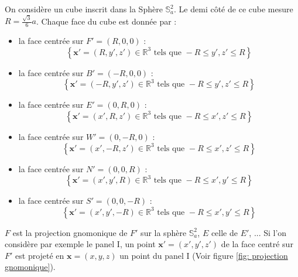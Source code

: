 On considère un cube inscrit dans la Sphère $\mathbb{S}_a^2$. Le demi côté de ce cube mesure $R=\frac{\sqrt{3}}{6}a$. Chaque face du cube est donnée par :
\begin{itemize}
\item la face centrée sur $F'=(R,0,0)$ : 
\begin{equation}
\left\lbrace
\mathbf{x}' = (R,y',z') \in \mathbb{R}^3 \text{ tels que } -R  \leq y',z' \leq R
\right\rbrace
\end{equation}

\item la face centrée sur $B'=(-R,0,0)$ : 
\begin{equation}
\left\lbrace
\mathbf{x}' = (-R,y',z') \in \mathbb{R}^3 \text{ tels que } -R  \leq y',z' \leq R
\right\rbrace
\end{equation}

\item la face centrée sur $E'=(0,R,0)$ : 
\begin{equation}
\left\lbrace
\mathbf{x}' = (x',R,z') \in \mathbb{R}^3 \text{ tels que } -R  \leq x',z' \leq R
\right\rbrace
\end{equation}

\item la face centrée sur $W'=(0,-R,0)$ : 
\begin{equation}
\left\lbrace
\mathbf{x}' = (x',-R,z') \in \mathbb{R}^3 \text{ tels que } -R  \leq x',z' \leq R
\right\rbrace
\end{equation}

\item la face centrée sur $N'=(0,0,R)$ : 
\begin{equation}
\left\lbrace
\mathbf{x}' = (x',y',R) \in \mathbb{R}^3 \text{ tels que } -R  \leq x',y' \leq R
\right\rbrace
\end{equation}

\item la face centrée sur $S'=(0,0,-R)$ : 
\begin{equation}
\left\lbrace
\mathbf{x}' = (x',y',-R) \in \mathbb{R}^3 \text{ tels que } -R  \leq x',y' \leq R
\right\rbrace
\end{equation}
\end{itemize}

$F$ est la projection gnomonique de $F'$ sur la sphère $\mathbb{S}_a^2$, $E$ celle de $E'$, ...
Si l'on considère par exemple le panel I, un point $\mathbf{x}'=(x',y',z')$ de la face centré sur $F'$ est projeté en $\mathbf{x} = (x,y,z)$ un point du panel I (Voir figure \ref{fig: projection gnomonique}).

